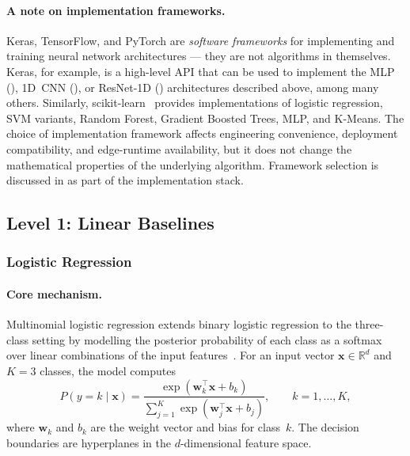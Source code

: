 \paragraph{A note on implementation frameworks.}
Keras, TensorFlow, and PyTorch are \emph{software frameworks} for
implementing and training neural network architectures --- they are
not algorithms in themselves.  Keras, for example, is a high-level API
that can be used to implement the MLP (), 1D~CNN
(), or ResNet-1D ()
architectures described above, among many others.  Similarly,
scikit-learn~\cite{sklearn_docs} provides implementations of logistic
regression, SVM variants, Random Forest, Gradient Boosted Trees, MLP,
and K-Means.  The choice of implementation framework affects engineering
convenience, deployment compatibility, and edge-runtime availability,
but it does not change the mathematical properties of the underlying
algorithm.  Framework selection is discussed in 
as part of the implementation stack.

\subsection{Level 1: Linear Baselines}\label{subsec:level1}
\subsubsection{Logistic Regression}\label{subsec:logreg}

\paragraph{Core mechanism.}
Multinomial logistic regression extends binary logistic regression to
the three-class setting by modelling the posterior probability of each
class as a softmax over linear combinations of the input
features~\cite{hosmer2013logistic}.  For an input vector
$\mathbf{x} \in \mathbb{R}^{d}$ and $K=3$ classes, the model computes
%
\begin{equation}
  P(y = k \mid \mathbf{x})
  = \frac{\exp(\mathbf{w}_k^\top \mathbf{x} + b_k)}
         {\sum_{j=1}^{K} \exp(\mathbf{w}_j^\top \mathbf{x} + b_j)},
  \qquad k = 1, \dots, K,
\end{equation}
%
where $\mathbf{w}_k$ and $b_k$ are the weight vector and bias for
class~$k$.  The decision boundaries are hyperplanes in the
$d$-dimensional feature space.

